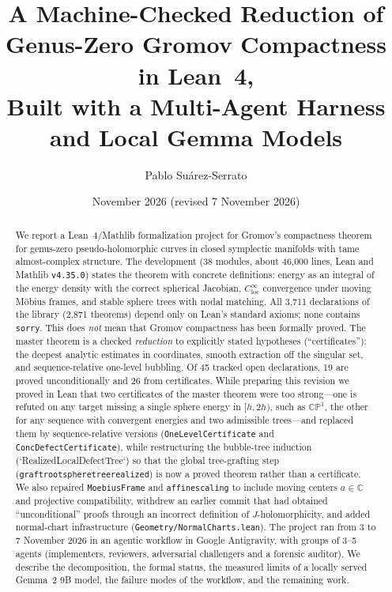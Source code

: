 \documentclass[11pt]{article}
\title{A Machine-Checked Reduction of Genus-Zero Gromov Compactness in Lean~4,\\
Built with a Multi-Agent Harness and Local Gemma Models}
\author{Pablo Su\'arez-Serrato}
\date{November 2026 (revised 7 November 2026)}
\renewcommand{\_}{\origus\allowbreak}
\newcommand{\CP}{\mathbb{CP}^1}
\newcommand{\C}{\mathbb{C}}
\newcommand{\code}[1]{\texttt{#1}}
\newcommand{\NdeclClean}{3{,}711}
\newcommand{\NthmClean}{2{,}871}
\begin{document}
\maketitle

\begin{abstract}
We report a Lean~4/Mathlib formalization project for Gromov's compactness theorem for genus-zero
pseudo-holomorphic curves in closed symplectic manifolds with tame almost-complex structure.
The development (38 modules, about 46{,}000 lines, Lean and Mathlib \code{v4.35.0}) states the
theorem with concrete definitions: energy as an integral of the energy density with the correct
spherical Jacobian, $C^\infty_{\mathrm{loc}}$ convergence under moving M\"obius frames, and stable
sphere trees with nodal matching. All \NdeclClean{} declarations of the library (\NthmClean{}
theorems) depend only on Lean's standard axioms; none contains \code{sorry}. This does \emph{not}
mean that Gromov compactness has been formally proved. The master theorem is a checked
\emph{reduction} to explicitly stated hypotheses (``certificates''): the deepest analytic estimates
in coordinates, smooth extraction off the singular set, and sequence-relative one-level bubbling.
Of 45 tracked open declarations, 19 are proved unconditionally and 26 from certificates.
While preparing this revision we proved in Lean that two certificates of the master theorem were
too strong---one is refuted on any target missing a single sphere energy in $[h,2h)$, such as
$\CP$, the other for any sequence with convergent energies and two admissible trees---and replaced
them by sequence-relative versions (\code{OneLevelCertificate} and \code{ConcDefectCertificate}),
while restructuring the bubble-tree induction (`RealizedLocalDefectTree`) so that the global
tree-grafting step (\code{graft\_root\_sphere\_tree\_realized}) is now a proved theorem rather than
a certificate. We also repaired \code{MoebiusFrame} and \code{affine\_scaling} to include moving
centers $a\in\C$ and projective compatibility, withdrew an earlier commit that had obtained
``unconditional'' proofs through an incorrect definition of $J$-holomorphicity, and added
normal-chart infrastructure (\code{Geometry/NormalCharts.lean}). The project ran from 3 to 7
November 2026 in an agentic workflow in Google Antigravity, with groups of 3--5 agents
(implementers, reviewers, adversarial challengers and a forensic auditor). We describe the
decomposition, the formal status, the measured limits of a locally served Gemma~2 9B model, the
failure modes of the workflow, and the remaining work.
\end{abstract}
\end{document}
